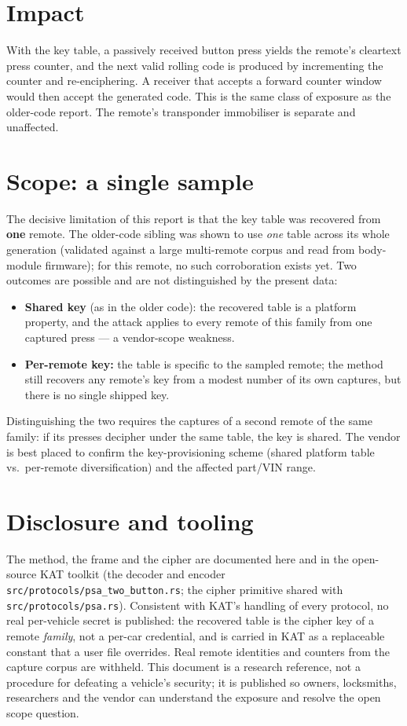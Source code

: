 \documentclass[11pt,a4paper]{article}
\begin{document}
\section{Impact}
With the key table, a passively received button press yields the remote's cleartext press counter, and the next valid rolling code is produced by incrementing the counter and re-enciphering. A receiver that accepts a forward counter window would then accept the generated code. This is the same class of exposure as the older-code report. The remote's transponder immobiliser is separate and unaffected.

\section{Scope: a single sample}\label{sec:scope}
The decisive limitation of this report is that the key table was recovered from \textbf{one} remote. The older-code sibling was shown to use \emph{one} table across its whole generation (validated against a large multi-remote corpus and read from body-module firmware); for this remote, no such corroboration exists yet. Two outcomes are possible and are not distinguished by the present data:
\begin{itemize}
\item \textbf{Shared key} (as in the older code): the recovered table is a platform property, and the attack applies to every remote of this family from one captured press --- a vendor-scope weakness.
\item \textbf{Per-remote key:} the table is specific to the sampled remote; the method still recovers any remote's key from a modest number of its own captures, but there is no single shipped key.
\end{itemize}
Distinguishing the two requires the captures of a second remote of the same family: if its presses decipher under the same table, the key is shared. The vendor is best placed to confirm the key-provisioning scheme (shared platform table vs.\ per-remote diversification) and the affected part/VIN range.

\section{Disclosure and tooling}
The method, the frame and the cipher are documented here and in the open-source KAT toolkit (the decoder and encoder \texttt{src/protocols/psa\_two\_button.rs}; the cipher primitive shared with \texttt{src/protocols/psa.rs}). Consistent with KAT's handling of every protocol, no real per-vehicle secret is published: the recovered table is the cipher key of a remote \emph{family}, not a per-car credential, and is carried in KAT as a replaceable constant that a user file overrides. Real remote identities and counters from the capture corpus are withheld. This document is a research reference, not a procedure for defeating a vehicle's security; it is published so owners, locksmiths, researchers and the vendor can understand the exposure and resolve the open scope question.
\end{document}
